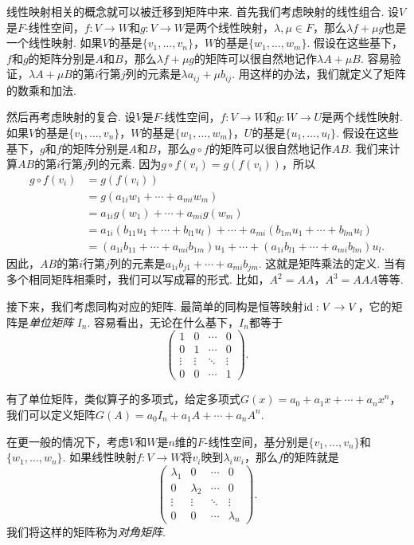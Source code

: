 线性映射相关的概念就可以被迁移到矩阵中来. 首先我们考虑映射的线性组合. 设$V$是$F$-线性空间，$f:V\to W$和$g:V\to W$是两个线性映射，$\lambda,\mu\in F$，那么$\lambda f+\mu g$也是一个线性映射. 如果$V$的基是$\{v_1,\dots,v_n\}$，$W$的基是$\{w_1,\dots,w_m\}$. 假设在这些基下，$f$和$g$的矩阵分别是$A$和$B$，那么$\lambda f+\mu g$的矩阵可以很自然地记作$\lambda A+\mu B$. 容易验证，$\lambda A+\mu B$的第$i$行第$j$列的元素是$\lambda a_{ij}+\mu b_{ij}$. 用这样的办法，我们就定义了矩阵的数乘和加法. 


然后再考虑映射的复合. 设$V$是$F$-线性空间，$f:V\to W$和$g:W\to U$是两个线性映射. 如果$V$的基是$\{v_1,\dots,v_n\}$，$W$的基是$\{w_1,\dots,w_m\}$，$U$的基是$\{u_1,\dots,u_l\}$. 假设在这些基下，$g$和$f$的矩阵分别是$A$和$B$，那么$g\circ f$的矩阵可以很自然地记作$AB$. 我们来计算$AB$的第$i$行第$j$列的元素. 因为$g\circ f(v_i)=g(f(v_i))$，所以
\begin{align*}
    g\circ f(v_i)&=g(f(v_i))\\
    &=g(a_{1i}w_1+\cdots+a_{mi}w_m)\\
    &=a_{1i}g(w_1)+\cdots+a_{mi}g(w_m)\\
    &=a_{1i}(b_{11}u_1+\cdots+b_{l1}u_l)+\cdots+a_{mi}(b_{1m}u_1+\cdots+b_{lm}u_l)\\
    &=(a_{1i}b_{11}+\cdots+a_{mi}b_{1m})u_1+\cdots+(a_{1i}b_{l1}+\cdots+a_{mi}b_{lm})u_l.
\end{align*}
因此，$AB$的第$i$行第$j$列的元素是$a_{1i}b_{j1}+\cdots+a_{mi}b_{jm}$. 这就是矩阵乘法的定义. 当有多个相同矩阵相乘时，我们可以写成幂的形式. 比如，$A^2=AA$，$A^3=AAA$等等. 

接下来，我们考虑同构对应的矩阵. 最简单的同构是恒等映射$\mathrm{id}:V\to V$，它的矩阵是\emph{单位矩阵} $I_n$. 容易看出，无论在什么基下，$I_n$都等于
\[\begin{pmatrix}
1&0&\cdots&0\\
0&1&\cdots&0\\
\vdots&\vdots&\ddots&\vdots\\
0&0&\cdots&1
\end{pmatrix}.\]

有了单位矩阵，类似算子的多项式，给定多项式$G(x)=a_0+a_1x+\cdots+a_nx^n$，我们可以定义矩阵$G(A)=a_0I_n+a_1A+\cdots+a_nA^n$. 

在更一般的情况下，考虑$V$和$W$是$n$维的$F$-线性空间，基分别是$\{v_1,\dots,v_n\}$和$\{w_1,\dots,w_n\}$. 如果线性映射$f:V\to W$将$v_i$映到$\lambda_i w_i$，那么$f$的矩阵就是
\[\begin{pmatrix}
\lambda_1&0&\cdots&0\\
0&\lambda_2&\cdots&0\\
\vdots&\vdots&\ddots&\vdots\\
0&0&\cdots&\lambda_n
\end{pmatrix}.\]
我们将这样的矩阵称为\emph{对角矩阵}. 

